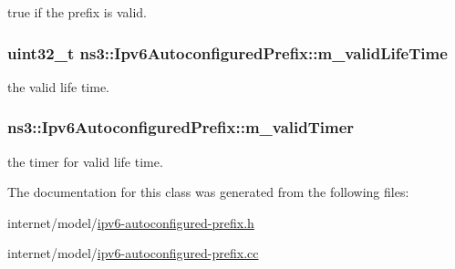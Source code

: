 true if the prefix is valid. 

\subsubsection[{\texorpdfstring{m\+\_\+valid\+Life\+Time}{m_validLifeTime}}]{\setlength{\rightskip}{0pt plus 5cm}uint32\+\_\+t ns3\+::\+Ipv6\+Autoconfigured\+Prefix\+::m\+\_\+valid\+Life\+Time\hspace{0.3cm}{\ttfamily [private]}}\hypertarget{classns3_1_1Ipv6AutoconfiguredPrefix_aae0f375bb88cadd1ac25a1d9834df536}{}\label{classns3_1_1Ipv6AutoconfiguredPrefix_aae0f375bb88cadd1ac25a1d9834df536}


the valid life time. 

\subsubsection[{\texorpdfstring{m\+\_\+valid\+Timer}{m_validTimer}}]{ ns3\+::\+Ipv6\+Autoconfigured\+Prefix\+::m\+\_\+valid\+Timer\hspace{0.3cm}{\ttfamily [private]}}\hypertarget{classns3_1_1Ipv6AutoconfiguredPrefix_aa28cf075b51ad6528bd8cf4be0f5d964}{}\label{classns3_1_1Ipv6AutoconfiguredPrefix_aa28cf075b51ad6528bd8cf4be0f5d964}


the timer for valid life time. 



The documentation for this class was generated from the following files\+:\begin{DoxyCompactItemize}
\item 
internet/model/\hyperlink{ipv6-autoconfigured-prefix_8h}{ipv6-\/autoconfigured-\/prefix.\+h}\item 
internet/model/\hyperlink{ipv6-autoconfigured-prefix_8cc}{ipv6-\/autoconfigured-\/prefix.\+cc}\end{DoxyCompactItemize}
